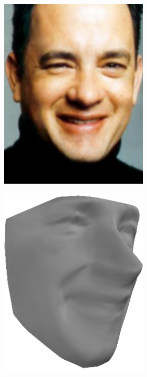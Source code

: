 \begin{figure}
\begin{subfigure}{0.32\textwidth}
\label{fig:samuel-beckett-textured}
    \end{subfigure}
    \\
    \begin{subfigure}{0.32\textwidth}
        \centering
        \includegraphics[width=0.8\textwidth]{statistical_normals/images/gsfs_results/celebrities/tom_hanks.png}
\label{fig:tom-hanks-input}
    \end{subfigure}
    \begin{subfigure}{0.32\textwidth}
        \centering
        \includegraphics[width=0.8\textwidth]{statistical_normals/images/gsfs_results/celebrities/tom_hanks_spherical.png}

\end{subfigure}
\end{figure}
